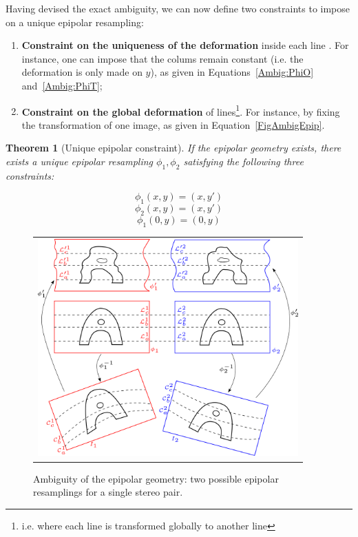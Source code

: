 \documentclass{ipol}
\newtheorem{theorem}{Theorem}
\begin{document}
Having devised the exact ambiguity, we can now define two constraints to impose on a unique epipolar resampling: 
\begin{enumerate}
\item \textbf{Constraint on the uniqueness of the deformation}
inside each line . For instance, one can impose that the colums remain constant (i.e.
the deformation is only made  on  $y$), as given in Equations~\eqref{Ambig:PhiO}
and~\eqref{Ambig:PhiT};
\item \textbf{Constraint on the global deformation} of lines\footnote{i.e. where each line
is transformed globally to another line}. For instance, by fixing the transformation of one image, as given in Equation~\eqref{FigAmbigEpip}.
\end{enumerate}
 

\begin{theorem}[Unique epipolar constraint]

If the epipolar geometry exists, there exists a unique epipolar resampling $\phi_1,\phi_2$ satisfying the  following three constraints:

\begin{equation}
    \phi_1(x,y) = (x,y') \label{Ambig:PhiO}
\end{equation}
\begin{equation}
    \phi_2(x,y) = (x,y') \label{Ambig:PhiT}
\end{equation}
\begin{equation}
    \phi_1(0,y) = (0,y) \label{Ambig:Line}
\end{equation}
\label{Theo:Fix:Ambig}

\end{theorem}

\begin{figure}[h!]
\centering
\begin{tabular}{c}
\includegraphics[width=10cm]{FIGS/AmbigEpip.png}
\end{tabular}
\caption{Ambiguity of the epipolar geometry: two possible epipolar resamplings for a single stereo pair.}
\label{FigAmbigEpip}
\end{figure}
\end{document}
